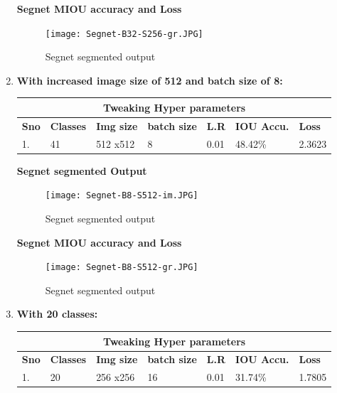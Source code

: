 \documentclass{IEEEtran}
\begin{document}
\begin{enumerate}
\textbf{Segnet MIOU accuracy and Loss}

\begin{figure}[h]
    \centering
    \captionsetup{justification=centering}
    \texttt{[image: Segnet-B32-S256-gr.JPG]}
    \caption{Segnet segmented output}
    \label{fig:Binary class segmented output}
\end{figure}


\item \textbf{With increased image size of 512 and batch size of 8:}
\newline
\begin{tabular}{ |p{0.6cm}|p{1.2cm}|p{0.6cm}|p{0.6cm}|p{0.6cm}|p{0.8cm}|p{0.8cm}|}
 \hline
 \multicolumn{7}{|c|}{\textbf{Tweaking Hyper parameters}} \\
 \hline
 \textbf{Sno} & \textbf{Classes} & \textbf{Img size} & \textbf{batch size} & \textbf{L.R} & \textbf{IOU Accu.} & \textbf{Loss} \\
 \hline
 1. & 41   & 512 x512   & 8  & 0.01 & 48.42\% & 2.3623 \\
 \hline
\end{tabular}

\textbf{Segnet segmented Output}

\begin{figure}[h]
    \centering
    \captionsetup{justification=centering}
    \texttt{[image: Segnet-B8-S512-im.JPG]}
    \caption{Segnet segmented output}
    \label{fig:Binary class segmented output}
\end{figure}


\textbf{Segnet MIOU accuracy and Loss}

\begin{figure}[h]
    \centering
    \captionsetup{justification=centering}
    \texttt{[image: Segnet-B8-S512-gr.JPG]}
    \caption{Segnet segmented output}
    \label{fig:Binary class segmented output}
\end{figure}

\item \textbf{With 20 classes:}
\newline
\begin{tabular}{ |p{0.6cm}|p{1.2cm}|p{0.6cm}|p{0.6cm}|p{0.6cm}|p{0.8cm}|p{0.8cm}|}
 \hline
 \multicolumn{7}{|c|}{\textbf{Tweaking Hyper parameters}} \\
 \hline
 \textbf{Sno} & \textbf{Classes} & \textbf{Img size} & \textbf{batch size} & \textbf{L.R} & \textbf{IOU Accu.} & \textbf{Loss} \\
 \hline
 1. & 20   & 256 x256   & 16  & 0.01 & 31.74\% & 1.7805 \\
 \hline
\end{tabular}



\end{enumerate}
\end{document}
